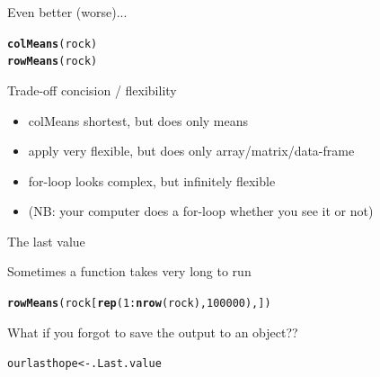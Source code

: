 \documentclass[10pt]{beamer}\usepackage[]{graphicx}\usepackage[]{color}
\makeatletter
\newcommand{\hlnum}[1]{\textcolor[rgb]{0.686,0.059,0.569}{#1}}%
\newcommand{\hlopt}[1]{\textcolor[rgb]{0,0,0}{#1}}%
\newcommand{\hlstd}[1]{\textcolor[rgb]{0.345,0.345,0.345}{#1}}%
\newcommand{\hlkwb}[1]{\textcolor[rgb]{0.69,0.353,0.396}{#1}}%
\newcommand{\hlkwd}[1]{\textcolor[rgb]{0.737,0.353,0.396}{\textbf{#1}}}%
\newenvironment{kframe}{%
 \def\at@end@of@kframe{}%
 \ifinner\ifhmode%
  \def\at@end@of@kframe{\end{minipage}}%
  \begin{minipage}{\columnwidth}%
 \fi\fi%
 \def\FrameCommand##1{\hskip\@totalleftmargin \hskip-\fboxsep
 \colorbox{shadecolor}{##1}\hskip-\fboxsep
     \hskip-\linewidth \hskip-\@totalleftmargin \hskip\columnwidth}%
 \MakeFramed {\advance\hsize-\width
   \@totalleftmargin\z@ \linewidth\hsize
   \@setminipage}}%
 {\par\unskip\endMakeFramed%
 \at@end@of@kframe}
\newenvironment{knitrout}{}{} %
\makeatother
\begin{document}
\begin{frame}[fragile]{Even better (worse)...}

\begin{knitrout}
\color{fgcolor}\begin{kframe}
\begin{alltt}
  \hlkwd{colMeans}\hlstd{(rock)}
  \hlkwd{rowMeans}\hlstd{(rock)}
\end{alltt}
\end{kframe}
\end{knitrout}

  \pause

  \begin{alertblock}{Trade-off concision  / flexibility}
    \begin{itemize}
      \item colMeans shortest, but does only means
      \item apply very flexible, but does only array/matrix/data-frame
      \item for-loop looks complex, but infinitely flexible
      \item (NB: your computer does a for-loop whether you see it or not)
    \end{itemize}
  \end{alertblock}

\end{frame}

\begin{frame}[fragile]{The last value}

Sometimes a function takes very long to run\\
\begin{knitrout}
\color{fgcolor}\begin{kframe}
\begin{alltt}
    \hlkwd{rowMeans}\hlstd{(rock[}\hlkwd{rep}\hlstd{(}\hlnum{1}\hlopt{:}\hlkwd{nrow}\hlstd{(rock),}\hlnum{100000}\hlstd{),])}
\end{alltt}
\end{kframe}
\end{knitrout}
\pause
What if you forgot to save the output to an object??

\pause 

\begin{knitrout}
\color{fgcolor}\begin{kframe}
\begin{alltt}
\hlstd{ourlasthope} \hlkwb{<-} \hlstd{.Last.value}
\end{alltt}
\end{kframe}
\end{knitrout}

\end{frame}
\end{document}
